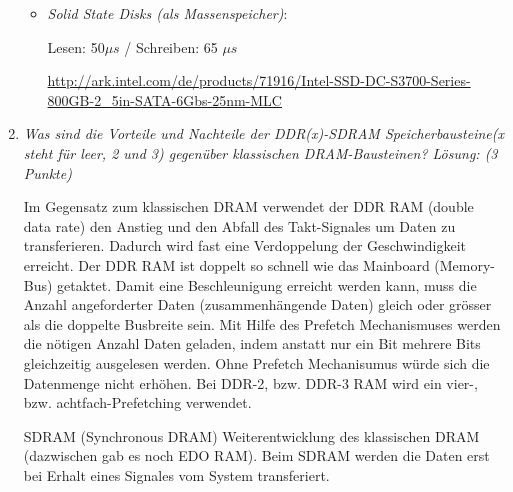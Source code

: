 \documentclass[10pt]{article}
\begin{document}
\begin{enumerate}[label=\alph*)]
\begin{itemize}
			
			\item \textit{Solid State Disks (als Massenspeicher)}:
			
			Lesen: 50$\mu s$ / Schreiben: 65 $\mu s$ 
			
			\url{http://ark.intel.com/de/products/71916/Intel-SSD-DC-S3700-Series-800GB-2_5in-SATA-6Gbs-25nm-MLC}
		\end{itemize}
		\item 
			\textit{Was sind die Vorteile und Nachteile der DDR(x)-SDRAM Speicherbausteine(x steht für leer, 2 und 3) gegenüber klassischen DRAM-Bausteinen? Lösung: (3 Punkte)}
		
		Im Gegensatz zum klassischen DRAM verwendet der DDR RAM (double data rate) den Anstieg und den Abfall des Takt-Signales um Daten zu transferieren. Dadurch wird fast eine Verdoppelung der Geschwindigkeit erreicht. Der DDR RAM ist doppelt so schnell wie das Mainboard (Memory-Bus) getaktet. Damit eine Beschleunigung erreicht werden kann, muss die Anzahl angeforderter Daten (zusammenhängende Daten) gleich oder grösser als die doppelte Busbreite sein. 
		Mit Hilfe des Prefetch Mechanismuses werden die nötigen Anzahl Daten geladen, indem anstatt nur ein Bit mehrere Bits gleichzeitig ausgelesen werden. Ohne Prefetch Mechanisumus würde sich die Datenmenge nicht erhöhen. Bei DDR-2, bzw. DDR-3 RAM wird ein vier-, bzw. achtfach-Prefetching verwendet. 

		SDRAM (Synchronous DRAM) Weiterentwicklung des klassischen DRAM (dazwischen gab es noch EDO RAM). Beim SDRAM werden die Daten erst bei Erhalt eines Signales vom System transferiert. 
		
\end{enumerate}


\end{document}
